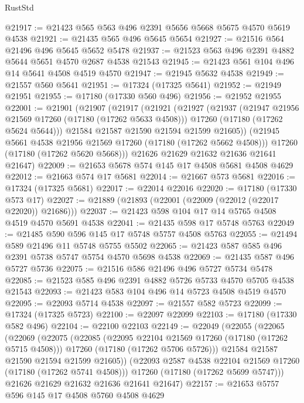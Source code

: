 \begin{lexlean}{RustStd}
\begin{coremodule}
@21917 := @21423 @565 @563 @496 @2391 @5656 @5668 @5675 @4570 @5619 @4538
@21921 := @21435 @565 @496 @5645 @5654
@21927 := @21516 @564 @21496 @496 @5645 @5652 @5478
@21937 := @21523 @563 @496 @2391 @4882 @5644 @5651 @4570 @2687 @4538 @21543
@21945 := @21423 @561 @104 @496 @14 @5641 @4508 @4519 @4570
@21947 := @21945 @5632 @4538
@21949 := @21557 @560 @5641
@21951 := @17324 (@17325 @5641)
@21952 := @21949 @21951
@21955 := @17180 (@17330 @560 @496)
@21956 := @21952 @21955
@22001 := @21901
    (@21907
      (@21917
        (@21921
          (@21927
            (@21937
              (@21947 @21956 @21569 @17260 (@17180 (@17262 @5633 @4508)))
              @17260
              (@17180 (@17262 @5624 @5644)))
            @21584
            @21587
            @21590
            @21594
            @21599
            @21605))
        (@21945 @5661 @4538 @21956 @21569 @17260 (@17180 (@17262 @5662 @4508)))
        @17260
        (@17180 (@17262 @5620 @5668)))
      @21626
      @21629
      @21632
      @21636
      @21641
      @21647)
@22009 := @21653 @5678 @574 @145 @17 @4508 @5681 @4508 @4629
@22012 := @21663 @574 @17 @5681
@22014 := @21667 @573 @5681
@22016 := @17324 (@17325 @5681)
@22017 := @22014 @22016
@22020 := @17180 (@17330 @573 @17)
@22027 := @21889 (@21893 (@22001 (@22009 (@22012 (@22017 @22020)) @21686)))
@22037 := @21423 @598 @104 @17 @14 @5765 @4508 @4519 @4570 @5691 @4538
@22041 := @21435 @598 @17 @5748 @5763
@22049 := @21485 @590 @596 @145 @17 @5748 @5757 @4508 @5763
@22055 := @21494 @589 @21496 @11 @5748 @5755 @5502
@22065 := @21423 @587 @585 @496 @2391 @5738 @5747 @5754 @4570 @5698 @4538
@22069 := @21435 @587 @496 @5727 @5736
@22075 := @21516 @586 @21496 @496 @5727 @5734 @5478
@22085 := @21523 @585 @496 @2391 @4882 @5726 @5733 @4570 @5705 @4538 @21543
@22093 := @21423 @583 @104 @496 @14 @5723 @4508 @4519 @4570
@22095 := @22093 @5714 @4538
@22097 := @21557 @582 @5723
@22099 := @17324 (@17325 @5723)
@22100 := @22097 @22099
@22103 := @17180 (@17330 @582 @496)
@22104 := @22100 @22103
@22149 := @22049
    (@22055
      (@22065
        (@22069
          (@22075
            (@22085
              (@22095 @22104 @21569 @17260 (@17180 (@17262 @5715 @4508)))
              @17260
              (@17180 (@17262 @5706 @5726)))
            @21584
            @21587
            @21590
            @21594
            @21599
            @21605))
        (@22093 @2587 @4538 @22104 @21569 @17260 (@17180 (@17262 @5741 @4508)))
        @17260
        (@17180 (@17262 @5699 @5747)))
      @21626
      @21629
      @21632
      @21636
      @21641
      @21647)
@22157 := @21653 @5757 @596 @145 @17 @4508 @5760 @4508 @4629

\end{coremodule}
\end{lexlean}
